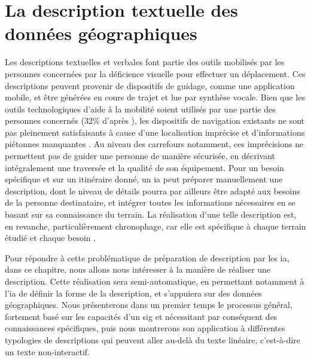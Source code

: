 \chapter{La description textuelle des données géographiques}

\label{chap:description}



Les descriptions textuelles et verbales font partie des outils mobilisés par les personnes concernées par la déficience visuelle pour effectuer un déplacement. Ces descriptions peuvent provenir de dispositifs de guidage, comme une application mobile, et être générées en cours de trajet et lue par synthèse vocale. Bien que les outils technologiques d'aide à la mobilité soient utilisés par une partie des personnes concernés (32\% d’après \citet{homere_2023}), les dispositifs de navigation existants ne sont pas pleinement satisfaisants à cause d’une localisation imprécise et d’informations piétonnes manquantes \citep{Guth2019}. Au niveau des carrefours notamment, ces imprécisions ne permettent pas de guider une personne de manière sécurisée, en décrivant intégralement une traversée et la qualité de son équipement. Pour un besoin spécifique et sur un itinéraire donné, un \gls{ia} peut préparer manuellement une description, dont le niveau de détails pourra par ailleurs être adapté aux besoins de la personne destinataire, et intégrer toutes les informations nécessaires en se basant sur sa connaissance du terrain. La réalisation d’une telle description est, en revanche, particulièrement chronophage, car elle est spécifique à chaque terrain étudié et chaque besoin \citep{kern2016}.

\newpar{}

Pour répondre à cette problématique de préparation de description par les \gls{ia}, dans ce chapitre, nous allons nous intéresser à la manière de réaliser une description. Cette réalisation sera semi-automatique, en permettant notamment à l'\gls{ia} de définir la forme de la description, et s'appuiera sur des données géographiques. Nous présenterons dans un premier temps le processus général, fortement basé sur les capacités d’un \gls{sig} et nécessitant par conséquent des connaissances spécifiques, puis nous montrerons son application à différentes typologies de descriptions qui peuvent aller au-delà du texte linéaire, c'est-à-dire un texte non-interactif.

